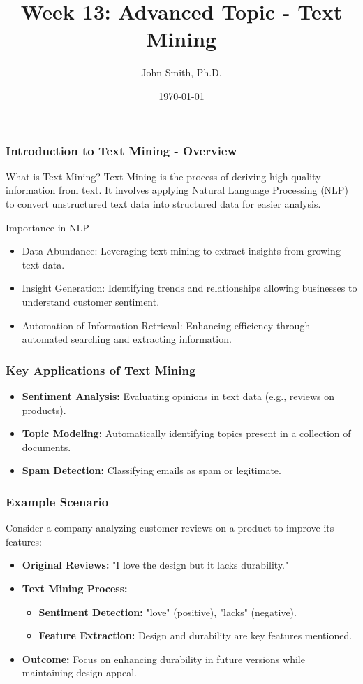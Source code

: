 \documentclass[aspectratio=169]{beamer}
\title[Text Mining]{Week 13: Advanced Topic - Text Mining}
\author[J. Smith]{John Smith, Ph.D.}
\institute[University Name]{
  Department of Computer Science\\
  University Name\\
  \vspace{0.3cm}
  Email: email@university.edu\\
  Website: www.university.edu
}
\date{\today}
\begin{document}
\frame{\titlepage}

\begin{frame}[fragile]
    \frametitle{Introduction to Text Mining - Overview}
    \begin{block}{What is Text Mining?}
        Text Mining is the process of deriving high-quality information from text. 
        It involves applying Natural Language Processing (NLP) to convert unstructured text data into structured data for easier analysis.
    \end{block}
    
    \begin{block}{Importance in NLP}
        \begin{itemize}
            \item Data Abundance: Leveraging text mining to extract insights from growing text data.
            \item Insight Generation: Identifying trends and relationships allowing businesses to understand customer sentiment.
            \item Automation of Information Retrieval: Enhancing efficiency through automated searching and extracting information.
        \end{itemize}
    \end{block}
\end{frame}

\begin{frame}[fragile]
    \frametitle{Key Applications of Text Mining}
    \begin{itemize}
        \item \textbf{Sentiment Analysis:} Evaluating opinions in text data (e.g., reviews on products).
        \item \textbf{Topic Modeling:} Automatically identifying topics present in a collection of documents.
        \item \textbf{Spam Detection:} Classifying emails as spam or legitimate.
    \end{itemize}
\end{frame}

\begin{frame}[fragile]
    \frametitle{Example Scenario}
    Consider a company analyzing customer reviews on a product to improve its features:
    \begin{itemize}
        \item \textbf{Original Reviews:} "I love the design but it lacks durability."
        \item \textbf{Text Mining Process:}
            \begin{itemize}
                \item \textbf{Sentiment Detection:} "love" (positive), "lacks" (negative).
                \item \textbf{Feature Extraction:} Design and durability are key features mentioned.
            \end{itemize}
        \item \textbf{Outcome:} Focus on enhancing durability in future versions while maintaining design appeal.
    \end{itemize}
\end{frame}
\end{document}
